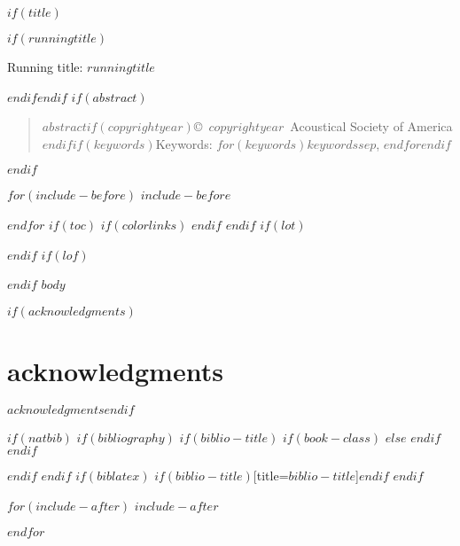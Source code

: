 \documentclass[$if(fontsize)$$fontsize$,$endif$$if(lang)$$babel-lang$,$endif$$if(papersize)$$papersize$paper,$endif$$for(classoption)$$classoption$$sep$,$endfor$]{$documentclass$}
\renewcommand{\refname}{\bfseries\large\uppercase{references}}
\begin{document}
\doublespacing

$if(title)$\maketitle$if(runningtitle)$\begin{center}Running title: $runningtitle$\end{center}$endif$$endif$
\cleardoublepage
\linenumbers
$if(abstract)$\begin{abstract}\noindent $abstract$$if(copyrightyear)$\newline\bigskip \copyright~$copyrightyear$~Acoustical Society of America$endif$$if(keywords)$\newline\bigskip\bigskip Keywords: $for(keywords)$$keywords$$sep$, $endfor$$endif$\end{abstract}\cleardoublepage$endif$

$for(include-before)$
$include-before$

$endfor$
$if(toc)$
{
$if(colorlinks)$
\hypersetup{linkcolor=$if(toccolor)$$toccolor$$else$black$endif$}
$endif$
\setcounter{tocdepth}{$toc-depth$}
\tableofcontents
}
$endif$
$if(lot)$
\listoftables
$endif$
$if(lof)$
\listoffigures
$endif$
$body$

\cleardoublepage

$if(acknowledgments)$\section*{acknowledgments}$acknowledgments$\cleardoublepage$endif$


$if(natbib)$
$if(bibliography)$
$if(biblio-title)$
$if(book-class)$
\renewcommand\bibname{$biblio-title$}
$else$
\renewcommand\refname{$biblio-title$}
$endif$
$endif$


$endif$
$endif$
$if(biblatex)$
\printbibliography$if(biblio-title)$[title=$biblio-title$]$endif$
$endif$

\cleardoublepage
\processdelayedfloats
\cleardoublepage
\listoffigures

$for(include-after)$
$include-after$

$endfor$
\end{document}
